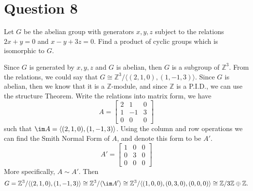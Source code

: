 \section{Question 8}

\begin{question}
    Let $G$ be the abelian group with generators $x, y, z$ subject to the relations $2 x+y=0$ and $x-y+3 z=0$. Find a product of cyclic groups which is isomorphic to $G$.
\end{question}

\begin{answer}
    Since $G$ is generated by $x,y,z$ and $G$ is abelian, then $G$ is a subgroup of $\mathbb{Z}^3$. From the relations, we could say that $G \cong \mathbb{Z}^3/\langle (2,1,0),(1,-1,3) \rangle$. Since $G$ is abelian, then we know that it is a $\mathbb{Z}$-module, and since $\mathbb{Z}$ is a P.I.D., we can use the structure Theorem. Write the relations into matrix form, we have
    \begin{equation}
        A = \left[
        \begin{matrix}
            2 & 1 & 0\\
            1 & -1 & 3\\
            0 & 0 & 0
        \end{matrix}
        \right]
    \end{equation}
    such that $\im A = \langle (2,1,0),(1,-1,3) \rangle$. Using the column and row operations we can find the Smith Normal Form of $A$, and denote this form to be $A'$.
    \begin{equation}
        A' = \left[
        \begin{matrix}
            1 & 0 & 0\\
            0 & 3 & 0\\
            0 & 0 & 0
        \end{matrix}
        \right]
    \end{equation}
    More specifically, $A \sim A'$. Then 
    \begin{equation}
        G = \mathbb{Z}^3/\langle (2,1,0),(1,-1,3) \rangle \cong \mathbb{Z}^3/\langle \im A'\rangle \cong \mathbb{Z}^3/\langle (1,0,0),(0,3,0),(0,0,0) \rangle \cong \mathbb{Z}/3\mathbb{Z} \oplus \mathbb{Z}.
    \end{equation}
\end{answer}